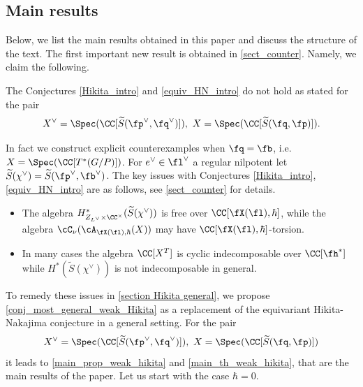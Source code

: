 \documentclass[12pt]{amsart}
\begin{document}
\subsection{Main results}
    Below, we list the main results obtained in this paper and discuss the structure of the text. The first important new result is obtained in \cref{sect_counter}. Namely, we claim the following.
    \begin{prop}\label{counterexample_intro}
        The Conjectures \ref{Hikita_intro} and \ref{equiv_HN_intro} do not hold as stated for the pair 
        \begin{equation*}
        X^\vee=\Spec(\CC[\widetilde{S}(\fp^\vee, \fq^\vee)]), ~X=\Spec(\CC[\widetilde{S}(\fq, \fp)]).
        \end{equation*}
    \end{prop}
    In fact we construct explicit counterexamples when $\fq=\fb$, i.e. $X=\Spec(\CC[T^*(G/P)])$. For $e^\vee\in \fl^\vee$ a regular  nilpotent let $\widetilde{S}(\chi^\vee)=\widetilde{S}(\fp^\vee, \fb^\vee)$. The key issues with Conjectures \ref{Hikita_intro}, \ref{equiv_HN_intro} are as follows, see \cref{sect_counter} for details.
    \begin{itemize}
        \item The algebra $H_{Z_{L^\vee}\times \CC^\times}^* (\widetilde{S}(\chi^\vee))$ is free over $\CC[\fX(\fl), \hbar]$, while the algebra $\cC_{\nu}(\cA_{\fX(\fl), \hbar}(X))$ may have $\CC[\fX(\fl), \hbar]$-torsion.
        \item In many cases the algebra $\CC[X^T]$ is cyclic indecomposable over $\CC[\fh^*]$ while $H^*(\widetilde{S}(\chi^\vee))$ is not indecomposable in general.
    \end{itemize}

    To remedy these issues in \cref{section Hikita general}, we propose \cref{conj_most_general_weak_Hikita} as a replacement of the equivariant Hikita-Nakajima conjecture in a general setting. For the pair 
    \begin{equation*}    X^\vee=\Spec(\CC[\widetilde{S}(\fp^\vee, \fq^\vee)]),~X=\Spec(\CC[\widetilde{S}(\fq, \fp)])
    \end{equation*}
    it leads to \cref{main_prop_weak_hikita} and \cref{main_th_weak_hikita}, that are the main results of the paper. Let us start with the case $\hbar=0$.
   
  
\end{document}
